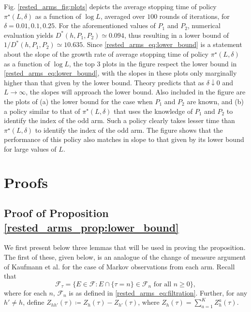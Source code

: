 Fig. \ref{rested_arms_fig:plots} depicts the average stopping time of policy $\pi^{\star}(L,\delta)$ as a function of $\log L$, averaged over $100$ rounds of iterations, for $\delta=0.01,0.1,0.25$. For the aforementioned values of $P_1$ and $P_2$, numerical evaluation yields $D^*(h,P_1,P_2) \simeq 0.094$, thus resulting in a lower bound of $1/D^*(h,P_1,P_2) \simeq 10.635$. Since \eqref{rested_arms_eq:lower_bound} is a statement about the slope of the growth rate of average stopping time of policy $\pi^{\star}(L,\delta)$ as a function of $\log L$, the top 3 plots in the figure respect the lower bound in \eqref{rested_arms_eq:lower_bound}, with the slopes in these plots only marginally higher than that given by the lower bound. Theory predicts that as $\delta \downarrow 0$ and $L\to\infty$, the slopes will approach the lower bound. Also included in the figure are the plots of (a) the lower bound for the case when $P_1$ and $P_2$ are known, and (b) a policy similar to that of $\pi^{\star}(L,\delta)$ that uses the knowledge of $P_1$ and $P_2$ to identify the index of the odd arm. Such a policy clearly takes lesser time than $\pi^\star(L,\delta)$ to identify the index of the odd arm. The figure shows that the performance of this policy also matches in slope to that given by its lower bound for large values of $L$.

\section{Proofs}\label{rested_arms_sec:proofs_of_main_results}
\subsection{Proof of Proposition \ref{rested_arms_prop:lower_bound}}\label{rested_arms_appndx:proof_of_lower_bound}
We first present below three lemmas that will be used in proving the proposition. The first of these, given below, is an analogue of the change of measure argument of Kaufmann et al. \cite[Lemma 18]{kaufmann2016complexity} for the case of Markov observations from each arm. Recall that
\begin{equation*}
	\mathcal{F}_\tau=\{E\in\mathcal{F}:E\cap \{\tau=n\}\in\mathcal{F}_n\text{ for all }n\geq 0 \},	
\end{equation*}
where for each $n$, $\mathcal{F}_n$ is as defined in \eqref{rested_arms_eq:filtration}. Further, for any $h'\neq h$, define $Z_{hh'}(\tau)\coloneqq Z_{h}(\tau)-Z_{h'}(\tau)$, where $Z_{h}(\tau)=\sum_{a=1}^{K}Z_{h}^a(\tau)$.

